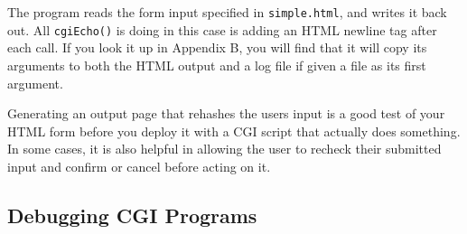 {The program reads the form input specified in \texttt{simple.html}, and
writes it back out. All \texttt{cgiEcho()} is doing in this case is
adding an HTML newline tag after each call. If you look it up in
Appendix B, you will find that it will copy its arguments to both the
HTML output and a log file if given a file as its first argument.


Generating an output page that rehashes the user{\textquotesingle}s
input is a good test of your HTML form before you deploy it with a CGI
script that actually does something. In some cases, it is also helpful
in allowing the user to recheck their submitted input and confirm or
cancel before acting on it.

\subsection{Debugging CGI Programs}

}
